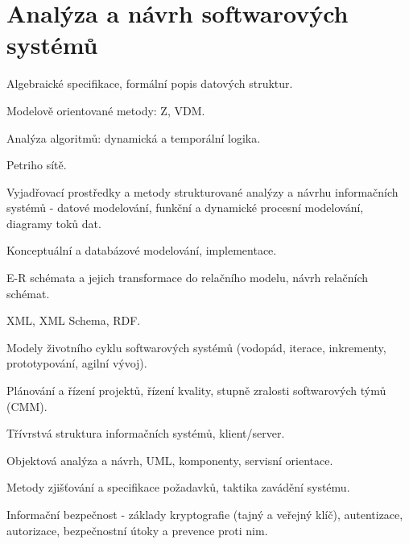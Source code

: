 \newpage
\section{Analýza a návrh softwarových systémů}
\begin{pozadavky}
\begin{pitemize}
\item Algebraické specifikace, formální popis datových struktur.
\item Modelově orientované metody: Z, VDM.
\item Analýza algoritmů: dynamická a temporální logika.
\item Petriho sítě.
\item Vyjadřovací prostředky a metody strukturované analýzy a návrhu informačních systémů - datové modelování, funkční a dynamické procesní modelování, diagramy toků dat.
\item Konceptuální a databázové modelování, implementace.
\item E-R schémata a jejich transformace do relačního modelu, návrh relačních schémat.
\item XML, XML Schema, RDF.
\item Modely životního cyklu softwarových systémů (vodopád, iterace, inkrementy, prototypování, agilní vývoj).
\item Plánování a řízení projektů, řízení kvality, stupně zralosti softwarových týmů (CMM).
\item Třívrstvá struktura informačních systémů, klient/server.
\item Objektová analýza a návrh, UML, komponenty, servisní orientace.
\item Metody zjišťování a specifikace požadavků, taktika zavádění systému.
\item Informační bezpečnost - základy kryptografie (tajný a veřejný klíč), autentizace, autorizace, bezpečnostní útoky a prevence proti nim.
\end{pitemize}
\end{pozadavky}